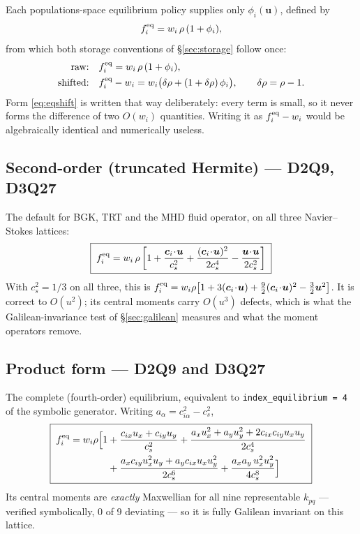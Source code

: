 \documentclass[11pt,a4paper]{article}
\newcommand{\code}[1]{\texttt{\small #1}}
\newcommand{\cs}{c_s}
\newcommand{\ci}{\bm{c}_i}
\newcommand{\uu}{\bm{u}}
\begin{document}
Each populations-space equilibrium policy supplies only $\phi_i(\uu)$, defined by
\begin{equation}
  f_i^{\rm eq} = w_i\,\rho\,(1+\phi_i),
\end{equation}
from which both storage conventions of \S\ref{sec:storage} follow once:
\begin{align}
  \text{raw:}     &\quad f_i^{\rm eq}       = w_i\,\rho\,(1+\phi_i), \\
  \text{shifted:} &\quad f_i^{\rm eq} - w_i = w_i\big(\delta\rho + (1+\delta\rho)\,\phi_i\big),
  \qquad \delta\rho = \rho-1 .
  \label{eq:eqshift}
\end{align}
Form \eqref{eq:eqshift} is written that way deliberately: every term is small, so
it never forms the difference of two $O(w_i)$ quantities. Writing it as
$f_i^{\rm eq}-w_i$ would be algebraically identical and numerically useless.

\subsection{Second-order (truncated Hermite) --- D2Q9, D3Q27}
\label{sec:eq2}

The default for BGK, TRT and the MHD fluid operator, on all three
Navier--Stokes lattices:
\begin{equation}
  \boxed{\;
  f_i^{\rm eq} = w_i\,\rho\left[
      1 + \frac{\ci\!\cdot\!\uu}{\cs^2}
        + \frac{(\ci\!\cdot\!\uu)^2}{2\cs^4}
        - \frac{\uu\!\cdot\!\uu}{2\cs^2}\right] \;}
  \label{eq:so}
\end{equation}
With $\cs^2=1/3$ on all three, this is
$f_i^{\rm eq}=w_i\rho\big[1+3(\ci\!\cdot\!\uu)+\tfrac92(\ci\!\cdot\!\uu)^2-\tfrac32\uu^2\big]$.
It is correct to $O(u^2)$; its central moments carry $O(u^3)$ defects, which is
what the Galilean-invariance test of \S\ref{sec:galilean} measures and what the
moment operators remove.

\subsection{Product form --- D2Q9 and D3Q27}
\label{sec:eqprod}

The complete (fourth-order) equilibrium, equivalent to
\code{index\_equilibrium = 4} of the symbolic generator. Writing
$a_\alpha = c_{i\alpha}^2-\cs^2$,
\begin{equation}
  \boxed{\;
  \begin{aligned}
  f_i^{\rm eq} = w_i\rho\Big[1
    &+ \frac{c_{ix}u_x+c_{iy}u_y}{\cs^2}
     + \frac{a_x u_x^2 + a_y u_y^2 + 2c_{ix}c_{iy}u_xu_y}{2\cs^4} \\
    &+ \frac{a_x c_{iy} u_x^2 u_y + a_y c_{ix} u_x u_y^2}{2\cs^6}
     + \frac{a_x a_y\, u_x^2 u_y^2}{4\cs^8}\Big]
  \end{aligned}\;}
  \label{eq:prod9}
\end{equation}
Its central moments are \emph{exactly} Maxwellian for all nine representable
$k_{pq}$ --- verified symbolically, 0 of 9 deviating --- so it is fully Galilean
invariant on this lattice.
\end{document}
